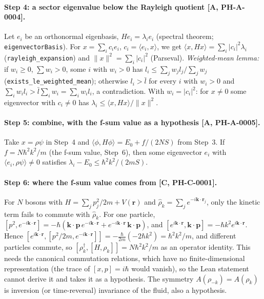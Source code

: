 \documentclass[11pt]{article}
\theoremstyle{remark}
\newcommand{\tier}[1]{\textsf{[#1]}}
\newcommand{\lean}[1]{\texttt{#1}}
\newcommand{\hb}{\hbar}
\newcommand{\rhoK}{\hat\rho_k}
\newcommand{\ip}[2]{\langle #1,#2\rangle}
\begin{document}
\paragraph{Step 4: a sector eigenvalue below the Rayleigh quotient \tier{A, PH-A-0004}.} Let $e_i$ be an orthonormal eigenbasis,
$He_i=\lambda_ie_i$ (spectral theorem; \lean{eigenvectorBasis}). For $x=\sum_ic_ie_i$, $c_i=\ip{e_i}{x}$, we get
$\ip{x}{Hx}=\sum_i|c_i|^2\lambda_i$ (\lean{rayleigh\_expansion}) and $\|x\|^2=\sum_i|c_i|^2$ (Parseval). \emph{Weighted-mean lemma:}
if $w_i\ge0$, $\sum w_i>0$, some $i$ with $w_i>0$ has $l_i\le\sum_jw_jl_j/\sum_jw_j$ (\lean{exists\_le\_weighted\_mean}); otherwise
$l_i>\bar l$ for every $i$ with $w_i>0$ and $\sum_iw_il_i>\bar l\sum_iw_i=\sum_iw_il_i$, a contradiction. With $w_i=|c_i|^2$:
for $x\ne0$ some eigenvector with $c_i\ne0$ has $\lambda_i\le\ip{x}{Hx}/\|x\|^2$.


\paragraph{Step 5: combine, with the f-sum value as a hypothesis \tier{A, PH-A-0005}.} Take $x=\rho\psi$ in Step~4 and
$\ip{\phi}{H\phi}=E_0+f/(2NS)$ from Step~3. If $f=N\hb^2k^2/m$ (the f-sum value, Step~6), then some eigenvector $e_i$ with
$\ip{e_i}{\rho\psi}\ne0$ satisfies $\lambda_i-E_0\le\hb^2k^2/(2mS)$.


\paragraph{Step 6: where the f-sum value comes from \tier{C, PH-C-0001}.} For $N$ bosons with $H=\sum_jp_j^2/2m+V(\mathbf r)$ and
$\rhoK=\sum_je^{-i\mathbf k\cdot\mathbf r_j}$, only the kinetic term fails to commute with $\rhoK$. For one particle,
$[p^2,e^{-i\mathbf k\cdot\mathbf r}]=-\hb(\mathbf k\cdot\mathbf p\,e^{-i\mathbf k\cdot\mathbf r}+e^{-i\mathbf k\cdot\mathbf r}\,\mathbf k\cdot\mathbf p)$, and
$[e^{i\mathbf k\cdot\mathbf r},\mathbf k\cdot\mathbf p]=-\hb k^2e^{i\mathbf k\cdot\mathbf r}$. Hence
$[e^{i\mathbf k\cdot\mathbf r},[p^2/2m,e^{-i\mathbf k\cdot\mathbf r}]]=-\tfrac{\hb}{2m}(-2\hb k^2)=\hb^2k^2/m$, and different particles commute, so
$[\rho_k^\dagger,[H,\rho_k]]=N\hb^2k^2/m$ as an operator identity. This needs the canonical commutation relations, which have no
finite-dimensional representation (the trace of $[x,p]=i\hb$ would vanish), so the Lean statement cannot derive it and takes it as a hypothesis. The
symmetry $A(\rho_{-k})=A(\rho_k)$ is inversion (or time-reversal) invariance of the fluid, also a hypothesis.
\end{document}

